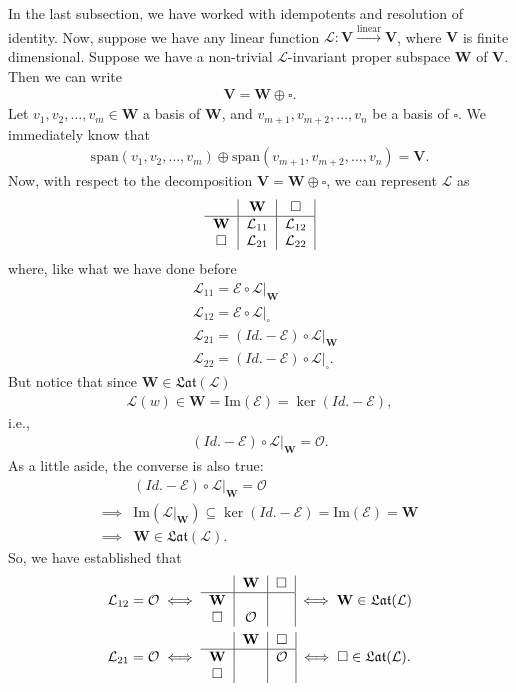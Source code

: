 \documentclass{book}
\theoremstyle{definition}
\newcommand{\V}{\mathbf{V}}
\newcommand{\W}{\mathbf{W}}
\newcommand{\xpan}{\text{span}}
\newcommand{\lag}{\mathcal{L}}
\newcommand{\E}{\mathcal{E}}
\newcommand{\ima}{\text{Im}}
\newcommand{\lin}{\overset{\text{linear}}{\longrightarrow}}
\begin{document}
In the last subsection, we have worked with idempotents and resolution of identity. Now, suppose we have any linear function $\lag : \V \lin \V$, where $\V$ is finite dimensional. Suppose we have a non-trivial $\lag$-invariant proper subspace $\W$ of $\V$. Then we can write
\begin{align*}
\V = \W \oplus \square.
\end{align*}
Let $v_1,v_2,\dots,v_m \in \W$ a basis of $\W$, and $v_{m+1}, v_{m+2},\dots, v_{n}$ be a basis of $\square$. We immediately know that 
\begin{align*}
\xpan(v_1,v_2,\dots,v_m) \oplus \xpan(v_{m+1}, v_{m+2},\dots, v_{n}) = \V.
\end{align*}
Now, with respect to the decomposition $\V = \W \oplus \square$, we can represent $\lag$ as
\begin{align*}
\begin{tabular}{c|c|c|}
& $\W$ & $\square$\\
\hline
$\W$& $\lag_{11}$& $\lag_{12}$\\	
$\square$& $\lag_{21}$ & $\lag_{22}$
\end{tabular}
\end{align*}
where, like what we have done before
\begin{align*}
&\lag_{11} = \E \circ \lag\bigg\vert_{\W}\\
&\lag_{12} = \E \circ \lag\bigg\vert_{\square}\\
&\lag_{21} = (Id.-\E) \circ \lag\bigg\vert_{\W}\\
&\lag_{22} = (Id.-\E) \circ \lag\bigg\vert_{\square}.
\end{align*}
But notice that since $\W \in \mathfrak{Lat}(\lag)$
\begin{align*}
\lag(w) \in \W = \ima(\E) = \ker(Id.- \E),
\end{align*}
i.e.,
\begin{align*}
(Id. - \E)\circ \lag \bigg\vert_{\W} = \mathcal{O}.
\end{align*}
As a little aside, the converse is also true:
\begin{align*}
&(Id. -\E)\circ \lag\bigg\vert_{\W} = \mathcal{O} \\
\implies &\ima\left(\lag\bigg\vert_\W\right) \subseteq \ker(Id. - \E) = \ima(\E) = \W \\
\implies &\W \in \mathfrak{Lat}(\lag).
\end{align*}
So, we have established that 
\begin{align*}
&\lag_{12} = \mathcal{O} \iff \begin{tabular}{c|c|c|}
& $\W$ & $\square$\\
\hline
$\W$& & \\	
$\square$& $\mathcal{O}$ & 
\end{tabular} \iff \W \in \mathfrak{Lat}(\lag)\\
&\lag_{21} = \mathcal{O} \iff \begin{tabular}{c|c|c|}
& $\W$ & $\square$\\
\hline
$\W$&  & $\mathcal{O}$ \\	
$\square$&  & 
\end{tabular} \iff \square \in \mathfrak{Lat}(\lag).
\end{align*}
\end{document}
